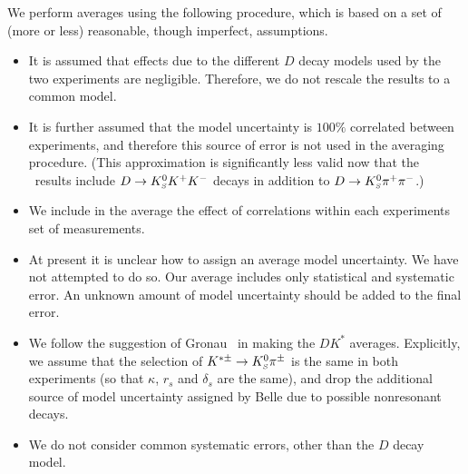We perform averages using the following procedure, which is based on a set of
(more or less) reasonable, though imperfect, assumptions. 

\begin{itemize}\setlength{\itemsep}{0.5ex}
\item 
  It is assumed that effects due to the different $D$ decay models 
  used by the two experiments are negligible. 
  Therefore, we do not rescale the results to a common model.
\item 
  It is further assumed that the model uncertainty is $100\%$ 
  correlated between experiments, 
  and therefore this source of error is not used in the averaging procedure.
  (This approximation is significantly less valid now that the \babar\ results
  include $D \to K^0_{\scriptscriptstyle S} K^+K^-$ decays in addition to $D \to K^0_{\scriptscriptstyle S}\pi^+\pi^-$.)
\item 
  We include in the average the effect of correlations 
  within each experiments set of measurements.
\item 
  At present it is unclear how to assign an average model uncertainty. 
  We have not attempted to do so. 
  Our average includes only statistical and systematic error. 
  An unknown amount of model uncertainty should be added to the final error.
\item 
  We follow the suggestion of Gronau~\cite{Gronau:2002mu} 
  in making the $DK^*$ averages. 
  Explicitly, we assume that the selection of $K^{*\pm} \to K^0_{\scriptscriptstyle S}\pi^\pm$
  is the same in both experiments 
  (so that $\kappa$, $r_s$ and $\delta_s$ are the same), 
  and drop the additional source of model uncertainty 
  assigned by Belle due to possible nonresonant decays.
\item 
  We do not consider common systematic errors, 
  other than the $D$ decay model. 
\end{itemize}



